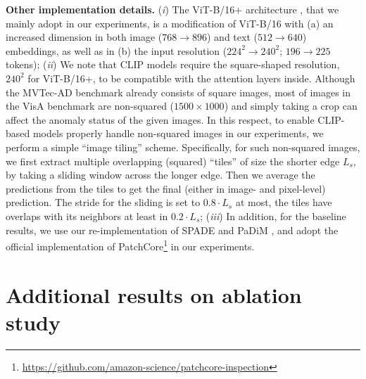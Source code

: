 \vspace{0.05in}
\noindent\textbf{Other implementation details.}
(\textit{i}) The ViT-B/16+ architecture \cite{ilharco_gabriel_2021_5143773}, that we mainly adopt in our experiments, is a modification of ViT-B/16 \cite{touvron2021training} with (a) an increased dimension in both image ($768 \rightarrow 896$) and text ($512 \rightarrow 640$) embeddings, as well as in (b) the input resolution ($224^2 \rightarrow 240^2$; $196 \rightarrow 225$ tokens);
(\textit{ii}) We note that CLIP models require the square-shaped resolution, \eg $240^2$ for ViT-B/16+, to be compatible with the attention layers inside. 
Although the MVTec-AD benchmark already consists of square images, most of images in the VisA benchmark are non-squared (\eg $1500\times1000$) and simply taking a crop can affect the anomaly status of the given images. 
In this respect, to enable CLIP-based models properly handle non-squared images in our experiments, we perform a simple ``image tiling'' scheme. Specifically, for such non-squared images, we first extract multiple overlapping (squared) ``tiles'' of size the shorter edge $L_s$, by taking a sliding window across the longer edge. Then we average the predictions from the tiles to get the final (either in image- and pixel-level) prediction. The stride for the sliding is set to $0.8\cdot L_s$ at most, \ie the tiles have overlaps with its neighbors at least in $0.2\cdot L_s$; (\textit{iii}) In addition, for the baseline results, we use our re-implementation of SPADE \cite{cohen2020sub} and PaDiM \cite{defard2021padim}, and adopt the official implementation of PatchCore\footnote{\url{https://github.com/amazon-science/patchcore-inspection}} in our experiments. 



\section{Additional results on ablation study}



